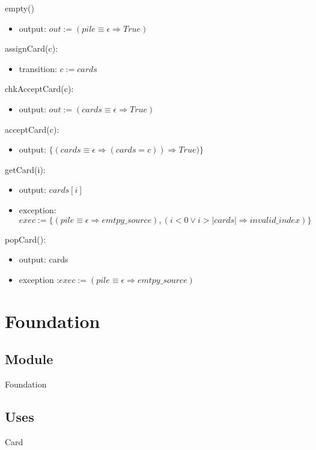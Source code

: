 \documentclass[12pt,fleqn]{article}
\begin{document}
\noindent empty()
\begin{itemize}
\item output: $out := (pile \equiv \epsilon \Rightarrow True)$
\end{itemize}

\noindent assignCard(c):
\begin{itemize}
\item transition: $c := cards$
\end{itemize}

\noindent chkAcceptCard(c):
\begin{itemize}
\item output: $out := (cards \equiv \epsilon \Rightarrow True)$  
\end{itemize}

\noindent acceptCard(c):
\begin{itemize}
\item output: $\{(cards \equiv \epsilon \Rightarrow (cards = c))\Rightarrow True)\}$
\end{itemize}

\noindent getCard(i):
\begin{itemize}
\item output: $cards[i]$
\item exception: $exec := \{(pile \equiv \epsilon \Rightarrow emtpy\_source),(i < 0 \lor i > |cards| \Rightarrow invalid\_index)\}$
\end{itemize}

\noindent popCard():
\begin{itemize}
\item output: cards
\item exception :$exec := (pile \equiv \epsilon \Rightarrow emtpy\_source)$
\end{itemize}


\section* {Foundation}

\subsection* {Module}

Foundation

\subsection* {Uses}

Card
\end{document}
